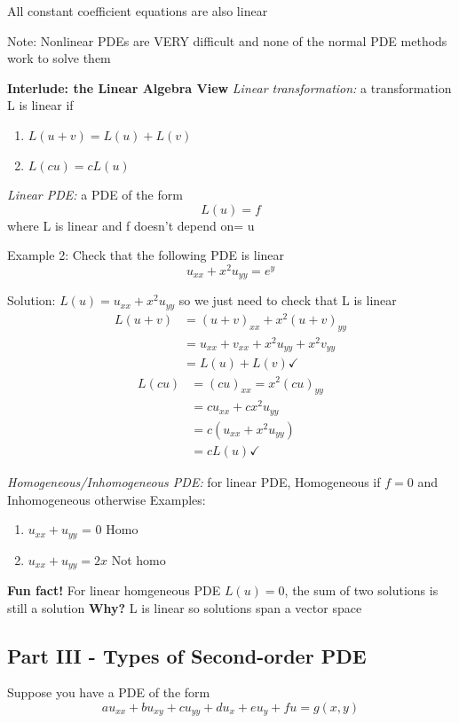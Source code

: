 \documentclass[12pt]{article}
\begin{document}
All constant coefficient equations are also linear 

Note: Nonlinear PDEs are VERY difficult and none of the normal PDE methods work to solve them

\textbf{Interlude: the Linear Algebra View}
\emph{Linear transformation:} a transformation L is linear if 
\begin{enumerate}
    \item $L(u + v) = L(u) + L(v)$
    \item $L(cu) = cL(u)$
\end{enumerate}

\emph{Linear PDE:} a PDE of the form 
\[L(u) = f\]
where L is linear and f doesn't depend on= u

Example 2: Check that the following PDE is linear 
\[u_{xx} + x^2u_{yy} = e^y\]

Solution: $L(u) = u_{xx} + x^2 u_{yy}$ so we just need to check that L is linear
\begin{align*}
    L(u + v) &= (u + v)_{xx} + x^2(u+v)_{yy}\\
    &= u_{xx} + v_{xx} + x^2 u_{yy} + x^2 v_{yy}\\
    &= L(u) + L(v) \checkmark
\end{align*}
\begin{align*}
    L(cu) &= (cu)_{xx} = x^2 (cu)_{yy}\\
    &= cu_{xx} + cx^2u_{yy}\\
    &= c(u_{xx} + x^2u_{yy})\\
    &= cL(u) \checkmark
\end{align*}

\emph{Homogeneous/Inhomogeneous PDE:} for linear PDE, Homogeneous if $f= 0$ and Inhomogeneous otherwise
Examples:
\begin{enumerate}
    \item $u_{xx} + u_{yy}$ = 0 \quad Homo
    \item $u_{xx} + u_{yy} = 2x$ \quad Not homo
\end{enumerate}

\textbf{Fun fact!}
For linear homgeneous PDE $L(u) = 0$, the sum of two solutions is still a solution
\textbf{Why?}
L is linear so solutions span a vector space

\subsection*{Part III - Types of Second-order PDE}
Suppose you have a PDE of the form
\[au_{xx} + bu_{xy} + cu_{yy} + du_x + eu_y + fu = g(x, y)\]
\end{document}
